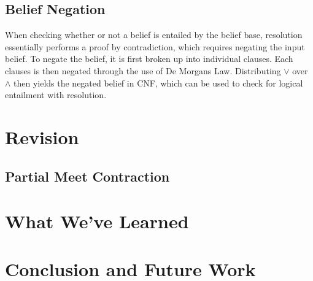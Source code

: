\documentclass[a4paper,10pt]{article}
\begin{document}
\subsection{Belief Negation}
\label{subsec:negation}
When checking whether or not a belief is entailed by the belief base, resolution essentially performs a proof by contradiction, which requires negating the input belief.
To negate the belief, it is first broken up into individual clauses. Each clauses is then negated through the use of De Morgans Law. Distributing $\vee$ over $\wedge$
then yields the negated belief in CNF, which can be used to check for logical entailment with resolution.

\section{Revision}
\label{sec:revision}


\subsection{Partial Meet Contraction}
\label{subsec:contraction}


\section{What We've Learned}
\label{sec:learned}


\section{Conclusion and Future Work}
\label{sec:conclusion}



\end{document}

